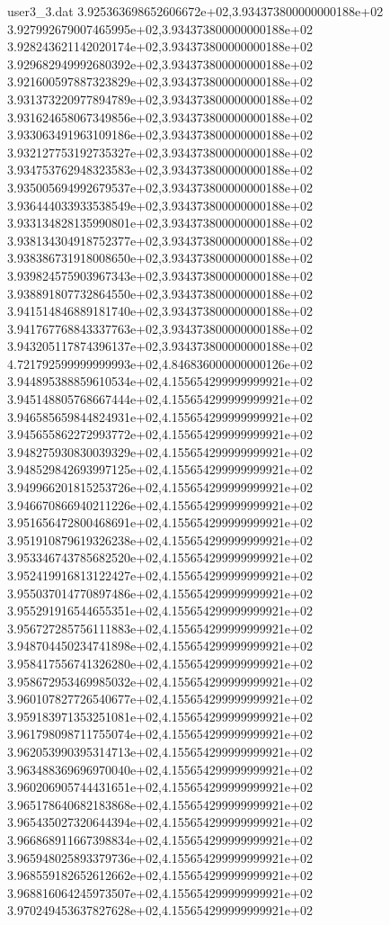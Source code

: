 \begin{filecontents}{user3_3.dat}
3.925363698652606672e+02,3.934373800000000188e+02
3.927992679007465995e+02,3.934373800000000188e+02
3.928243621142020174e+02,3.934373800000000188e+02
3.929682949992680392e+02,3.934373800000000188e+02
3.921600597887323829e+02,3.934373800000000188e+02
3.931373220977894789e+02,3.934373800000000188e+02
3.931624658067349856e+02,3.934373800000000188e+02
3.933063491963109186e+02,3.934373800000000188e+02
3.932127753192735327e+02,3.934373800000000188e+02
3.934753762948323583e+02,3.934373800000000188e+02
3.935005694992679537e+02,3.934373800000000188e+02
3.936444033933538549e+02,3.934373800000000188e+02
3.933134828135990801e+02,3.934373800000000188e+02
3.938134304918752377e+02,3.934373800000000188e+02
3.938386731918008650e+02,3.934373800000000188e+02
3.939824575903967343e+02,3.934373800000000188e+02
3.938891807732864550e+02,3.934373800000000188e+02
3.941514846889181740e+02,3.934373800000000188e+02
3.941767768843337763e+02,3.934373800000000188e+02
3.943205117874396137e+02,3.934373800000000188e+02
4.721792599999999993e+02,4.846836000000000126e+02
3.944895388859610534e+02,4.155654299999999921e+02
3.945148805768667444e+02,4.155654299999999921e+02
3.946585659844824931e+02,4.155654299999999921e+02
3.945655862272993772e+02,4.155654299999999921e+02
3.948275930830039329e+02,4.155654299999999921e+02
3.948529842693997125e+02,4.155654299999999921e+02
3.949966201815253726e+02,4.155654299999999921e+02
3.946670866940211226e+02,4.155654299999999921e+02
3.951656472800468691e+02,4.155654299999999921e+02
3.951910879619326238e+02,4.155654299999999921e+02
3.953346743785682520e+02,4.155654299999999921e+02
3.952419916813122427e+02,4.155654299999999921e+02
3.955037014770897486e+02,4.155654299999999921e+02
3.955291916544655351e+02,4.155654299999999921e+02
3.956727285756111883e+02,4.155654299999999921e+02
3.948704450234741898e+02,4.155654299999999921e+02
3.958417556741326280e+02,4.155654299999999921e+02
3.958672953469985032e+02,4.155654299999999921e+02
3.960107827726540677e+02,4.155654299999999921e+02
3.959183971353251081e+02,4.155654299999999921e+02
3.961798098711755074e+02,4.155654299999999921e+02
3.962053990395314713e+02,4.155654299999999921e+02
3.963488369696970040e+02,4.155654299999999921e+02
3.960206905744431651e+02,4.155654299999999921e+02
3.965178640682183868e+02,4.155654299999999921e+02
3.965435027320644394e+02,4.155654299999999921e+02
3.966868911667398834e+02,4.155654299999999921e+02
3.965948025893379736e+02,4.155654299999999921e+02
3.968559182652612662e+02,4.155654299999999921e+02
3.968816064245973507e+02,4.155654299999999921e+02
3.970249453637827628e+02,4.155654299999999921e+02

\end{filecontents}
